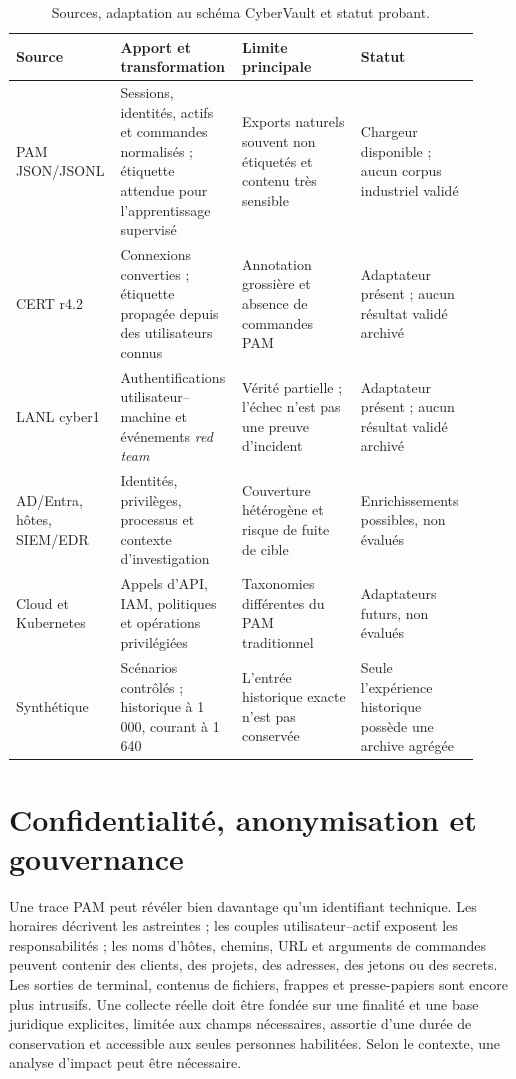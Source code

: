 \documentclass[11pt,a4paper,oneside]{report}
\theoremstyle{definition}
\theoremstyle{plain}
\begin{document}
\begin{table}[tb]
  \centering
  \caption{Sources, adaptation au schéma CyberVault et statut probant.}
  \label{tab:eval-real-sources}
  \scriptsize
  \begin{tabular}{@{}p{0.17\linewidth}p{0.25\linewidth}p{0.25\linewidth}p{0.25\linewidth}@{}}
    \toprule
    Source & Apport et transformation & Limite principale & Statut \\
    \midrule
    PAM JSON/JSONL &
    Sessions, identités, actifs et commandes normalisés ; étiquette attendue
    pour l'apprentissage supervisé &
    Exports naturels souvent non étiquetés et contenu très sensible &
    Chargeur disponible ; aucun corpus industriel validé \\
    CERT r4.2 &
    Connexions converties ; étiquette propagée depuis des utilisateurs connus &
    Annotation grossière et absence de commandes PAM &
    Adaptateur présent ; aucun résultat validé archivé \\
    LANL cyber1 &
    Authentifications utilisateur--machine et événements \emph{red team} &
    Vérité partielle ; l'échec n'est pas une preuve d'incident &
    Adaptateur présent ; aucun résultat validé archivé \\
    AD/Entra, hôtes, SIEM/EDR &
    Identités, privilèges, processus et contexte d'investigation &
    Couverture hétérogène et risque de fuite de cible &
    Enrichissements possibles, non évalués \\
    Cloud et Kubernetes &
    Appels d'API, IAM, politiques et opérations privilégiées &
    Taxonomies différentes du PAM traditionnel &
    Adaptateurs futurs, non évalués \\
    Synthétique &
    Scénarios contrôlés ; historique à 1\,000, courant à 1\,640 &
    L'entrée historique exacte n'est pas conservée &
    Seule l'expérience historique possède une archive agrégée \\
    \bottomrule
  \end{tabular}
\end{table}

\section{Confidentialité, anonymisation et gouvernance}

Une trace PAM peut révéler bien davantage qu'un identifiant technique. Les
horaires décrivent les astreintes ; les couples utilisateur--actif exposent les
responsabilités ; les noms d'hôtes, chemins, URL et arguments de commandes
peuvent contenir des clients, des projets, des adresses, des jetons ou des
secrets. Les sorties de terminal, contenus de fichiers, frappes et
presse-papiers sont encore plus intrusifs. Une collecte réelle doit être fondée
sur une finalité et une base juridique explicites, limitée aux champs
nécessaires, assortie d'une durée de conservation et accessible aux seules
personnes habilitées. Selon le contexte, une analyse d'impact peut être
nécessaire.
\end{document}
